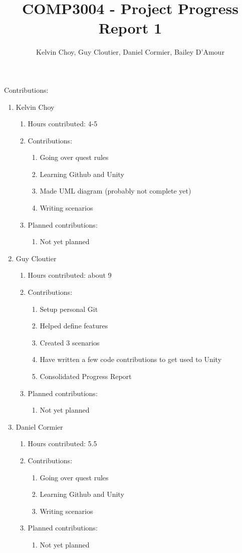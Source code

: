\documentclass[11pt]{article}
\title{COMP3004 - Project Progress Report 1}
\author{Kelvin Choy, Guy Cloutier, Daniel Cormier, Bailey D'Amour}
\date{}
\begin{document}
\maketitle

Contributions:
\begin{enumerate}
\item Kelvin Choy
\begin{enumerate}
\item Hours contributed: 4-5
\item Contributions:
\begin{enumerate}
\item Going over quest rules
\item Learning Github and Unity
\item Made UML diagram (probably not complete yet)
\item Writing scenarios
\end{enumerate}
\item Planned contributions:
\begin{enumerate}
\item Not yet planned
\end{enumerate}
\end{enumerate}

\item Guy Cloutier
\begin{enumerate}
\item Hours contributed: about 9
\item Contributions:
\begin{enumerate}
\item Setup personal Git
\item Helped define features
\item Created 3 scenarios
\item Have written a few code contributions to get used to Unity
\item Consolidated Progress Report
\end{enumerate}
\item Planned contributions:
\begin{enumerate}
\item Not yet planned
\end{enumerate}
\end{enumerate}

\item Daniel Cormier
\begin{enumerate}
\item Hours contributed: 5.5
\item Contributions:
\begin{enumerate}
\item Going over quest rules
\item Learning Github and Unity
\item Writing scenarios
\end{enumerate}
\item Planned contributions:
\begin{enumerate}
\item Not yet planned
\end{enumerate}
\end{enumerate}


\end{enumerate}
\end{document}
